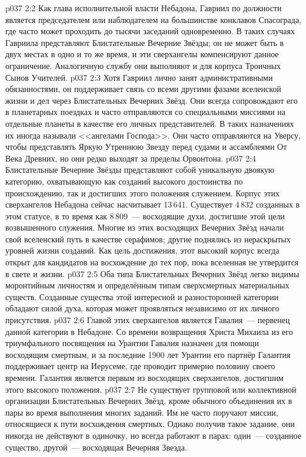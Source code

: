 \vs p037 2:2 Как глава исполнительной власти Небадона, Гавриил по должности является председателем или наблюдателем на большинстве конклавов Спасограда, где часто может проходить до тысячи заседаний одновременно. В таких случаях Гавриила представляют Блистательные Вечерние Звёзды; он не может быть в двух местах в одно и то же время, и эти сверхангелы компенсируют данное ограничение. Аналогичную службу они выполняют и для корпуса Троичных Сынов Учителей.
\vs p037 2:3 Хотя Гавриил лично занят административными обязанностями, он поддерживает связь со всеми другими фазами вселенской жизни и дел через Блистательных Вечерних Звёзд. Они всегда сопровождают его в планетарных поездках и часто отправляются со специальными миссиями на отдельные планеты в качестве его личных представителей. В таких назначениях их иногда называли <<ангелами Господа>>. Они часто отправляются на Уверсу, чтобы представлять Яркую Утреннюю Звезду перед судами и ассамблеями От Века Древних, но они редко выходят за пределы Орвонтона.
\vs p037 2:4 \pc Блистательные Вечерние Звёзды представляют собой уникальную двоякую категорию, охватывающую как созданий высокого достоинства по происхождению, так и достигших этого положения служением. Корпус этих сверхангелов Небадона сейчас насчитывает 13\,641. Существует 4\,832 созданных в этом статусе, в то время как 8\,809~--- восходящие духи, достигшие этой цели возвышенного служения. Многие из этих восходящих Вечерних Звёзд начали свой вселенский путь в качестве серафимов; другие поднялись из нераскрытых уровней жизни созданий. Как цель достижения, этот высокий корпус всегда открыт для кандидатов на восхождение до тех пор, пока вселенная не утвердится в свете и жизни.
\vs p037 2:5 Оба типа Блистательных Вечерних Звёзд легко видимы моронтийным личностям и определённым типам сверхсмертных материальных существ. Созданные существа этой интересной и разносторонней категории обладают силой духа, которая может проявляться независимо от их личного присутствия.
\vs p037 2:6 \pc Главой этих сверхангелов является Гавалия~--- первенец данной категории в Небадоне. Со времени возвращения Христа Михаила из его триумфального посвящения на Урантии Гавалия назначен для помощи восходящим смертным, и за последние 1900 лет Урантии его партнёр Галантия поддерживает центр на Иерусеме, где проводит примерно половину своего времени. Галантия является первым из восходящих сверхангелов, достигшим этого высокого положения.
\vs p037 2:7 Не существует групповой или коллективной организации Блистательных Вечерних Звёзд, кроме обычного объединения их в пары во время выполнения многих заданий. Им не часто поручают миссии, относящиеся к пути восхождения смертных. Однако получив такое задание, они никогда не действуют в одиночку, но всегда работают в парах: один~--- созданное существо, другой~--- восходящая Вечерняя Звезда.
